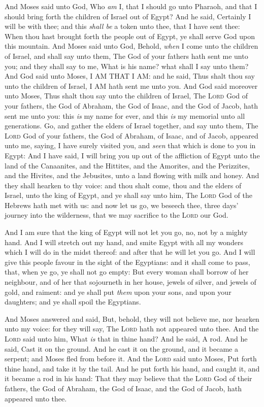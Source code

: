 \documentclass[11pt,letterpaper,oneside]{memoir}
\begin{document}
And Moses said unto God, Who \emph{am} I, that I should go unto Pharaoh,
and that I should bring forth the children of Israel out of Egypt? And
he said, Certainly I will be with thee; and this \emph{shall be} a token
unto thee, that I have sent thee: When thou hast brought forth the
people out of Egypt, ye shall serve God upon this mountain. And Moses
said unto God, Behold, \emph{when} I come unto the children of Israel,
and shall say unto them, The God of your fathers hath sent me unto you;
and they shall say to me, What is his name? what shall I say unto them?
And God said unto Moses, I AM THAT I AM: and he said, Thus shalt thou
say unto the children of Israel, I AM hath sent me unto you. And God
said moreover unto Moses, Thus shalt thou say unto the children of
Israel, The \textsc{Lord} God of your fathers, the God of Abraham, the
God of Isaac, and the God of Jacob, hath sent me unto you: this
\emph{is} my name for ever, and this \emph{is} my memorial unto all
generations. Go, and gather the elders of Israel together, and say unto
them, The \textsc{Lord} God of your fathers, the God of Abraham, of
Isaac, and of Jacob, appeared unto me, saying, I have surely visited
you, and \emph{seen} that which is done to you in Egypt: And I have
said, I will bring you up out of the affliction of Egypt unto the land
of the Canaanites, and the Hittites, and the Amorites, and the
Perizzites, and the Hivites, and the Jebusites, unto a land flowing with
milk and honey. And they shall hearken to thy voice: and thou shalt
come, thou and the elders of Israel, unto the king of Egypt, and ye
shall say unto him, The \textsc{Lord} God of the Hebrews hath met with
us: and now let us go, we beseech thee, three days' journey into the
wilderness, that we may sacrifice to the \textsc{Lord} our God.

And I am sure that the king of Egypt will not let you go, no, not by a
mighty hand. And I will stretch out my hand, and smite Egypt with all my
wonders which I will do in the midst thereof: and after that he will let
you go. And I will give this people favour in the sight of the
Egyptians: and it shall come to pass, that, when ye go, ye shall not go
empty: But every woman shall borrow of her neighbour, and of her that
sojourneth in her house, jewels of silver, and jewels of gold, and
raiment: and ye shall put \emph{them} upon your sons, and upon your
daughters; and ye shall spoil the Egyptians.

And Moses answered and said, But, behold, they will not believe me, nor
hearken unto my voice: for they will say, The \textsc{Lord} hath not
appeared unto thee. And the \textsc{Lord} said unto him, What \emph{is}
that in thine hand? And he said, A rod. And he said, Cast it on the
ground. And he cast it on the ground, and it became a serpent; and Moses
fled from before it. And the \textsc{Lord} said unto Moses, Put forth
thine hand, and take it by the tail. And he put forth his hand, and
caught it, and it became a rod in his hand: That they may believe that
the \textsc{Lord} God of their fathers, the God of Abraham, the God of
Isaac, and the God of Jacob, hath appeared unto thee.
\end{document}
